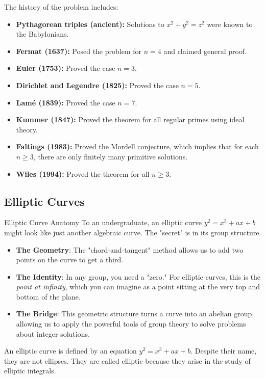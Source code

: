 The history of the problem includes:
\begin{itemize}
\item \textbf{Pythagorean triples (ancient):} Solutions to $x^2 + y^2 = z^2$ were known to the Babylonians.
\item \textbf{Fermat (1637):} Posed the problem for $n=4$ and claimed general proof.
\item \textbf{Euler (1753):} Proved the case $n=3$.
\item \textbf{Dirichlet and Legendre (1825):} Proved the case $n=5$.
\item \textbf{Lam\'e (1839):} Proved the case $n=7$.
\item \textbf{Kummer (1847):} Proved the theorem for all regular primes using ideal theory.
\item \textbf{Faltings (1983):} Proved the Mordell conjecture, which implies that for each $n \geq 3$, there are only finitely many primitive solutions.
\item \textbf{Wiles (1994):} Proved the theorem for all $n \geq 3$.
\end{itemize}

\subsection{Elliptic Curves}

\begin{knowledgebridge}{Elliptic Curve Anatomy}
To an undergraduate, an elliptic curve $y^2 = x^3 + ax + b$ might look like just another algebraic curve. The "secret" is in its group structure.
\begin{itemize}
    \item \textbf{The Geometry}: The "chord-and-tangent" method allows us to add two points on the curve to get a third.
    \item \textbf{The Identity}: In any group, you need a "zero." For elliptic curves, this is the \emph{point at infinity}, which you can imagine as a point sitting at the very top and bottom of the plane.
    \item \textbf{The Bridge}: This geometric structure turns a curve into an abelian group, allowing us to apply the powerful tools of group theory to solve problems about integer solutions.
\end{itemize}
\end{knowledgebridge}

An elliptic curve is defined by an equation $y^2 = x^3 + ax + b$. Despite their name, they are not ellipses. They are called elliptic because they arise in the study of elliptic integrals.


